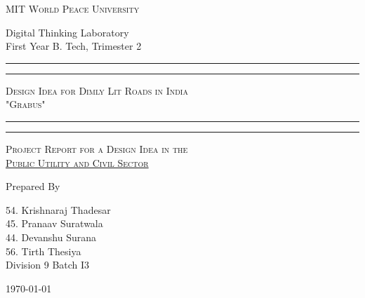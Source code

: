 \documentclass[11pt]{article}
\begin{document}
	
	\begin{titlepage} 
		\centering 
		
		
		\huge\textsc{
			MIT World Peace University
		}\\
	
		\vspace{0.75\baselineskip} %
		
		\LARGE{
			Digital Thinking Laboratory\\
			First Year B. Tech, Trimester 2
		}
		
		\vfill %
		
		
		\rule{\textwidth}{1.6pt}\vspace*{-\baselineskip}\vspace*{2pt}
		\rule{\textwidth}{0.6pt}
		\vspace{0.75\baselineskip} %
		
		
		
		\huge{\textsc{
				Design Idea for Dimly Lit Roads in India\\
				"Grabus"
			}} \\
		
		
		
		\vspace{0.5\baselineskip} %
		\rule{\textwidth}{0.6pt}\vspace*{-\baselineskip}\vspace*{2.8pt}
		\rule{\textwidth}{1.6pt}
		
		\vspace{1\baselineskip} %

			
		\LARGE\textsc{
			Project Report for a Design Idea in the\\ \underline{Public Utility and Civil Sector}
		} %
		\vfill
		
		
		Prepared By
		\vspace{0.5\baselineskip} %
		
		\Large{
			54. Krishnaraj Thadesar\\ 45. Pranaav Suratwala\\
			44. Devanshu Surana\\56. Tirth Thesiya\\
			Division 9 Batch I3
		}
		
		
		\vspace{0.5\baselineskip} %
		\today

	\end{titlepage}
	
\end{document}
